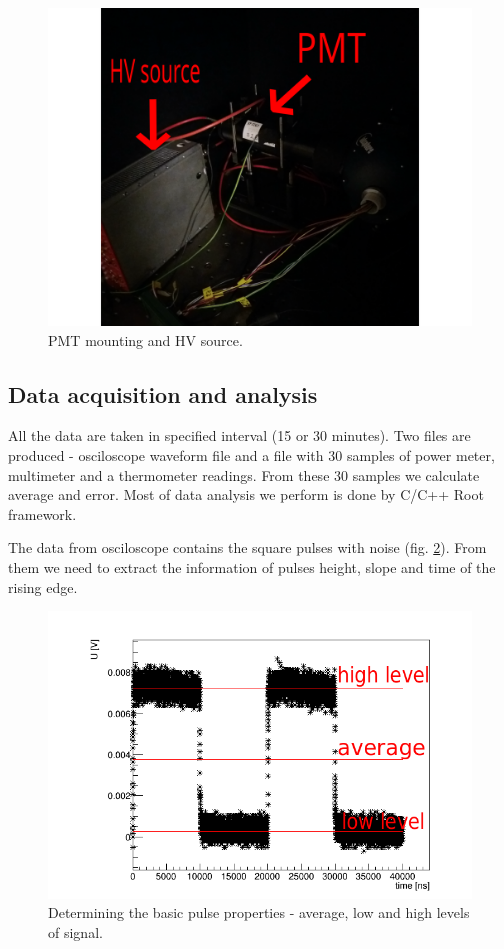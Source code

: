 \begin{figure}[H]
 \centering
 \includegraphics[scale = 0.09]{./pictures/aparature2b}
 \caption{PMT mounting and HV source.}
 \label{aparature2}
\end{figure}


\subsection{Data acquisition and analysis}
All the data are taken in specified interval (15 or 30 minutes). Two files are produced - osciloscope waveform file and a file with 30 samples of power meter, multimeter and a thermometer readings. From these 30 samples we calculate average and error. Most of data analysis we perform is done by C/C++ Root framework.
\par
The data from osciloscope contains the square pulses with noise (fig. \ref{pulse}). From them we need to extract the information of pulses height, slope and time of the rising edge.

 \begin{figure}[H]
 \centering
 \includegraphics[scale=0.65]{./pictures/PMTPulse}
 \caption{Determining the basic pulse properties - average, low and high levels of signal.}
 \label{pulse}
\end{figure}

